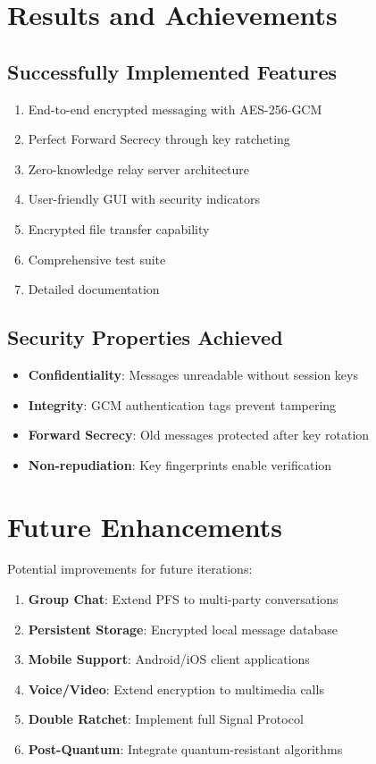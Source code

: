 \documentclass[12pt,a4paper]{article}
\begin{document}
\section{Results and Achievements}

\subsection{Successfully Implemented Features}

\begin{enumerate}
    \item End-to-end encrypted messaging with AES-256-GCM
    \item Perfect Forward Secrecy through key ratcheting
    \item Zero-knowledge relay server architecture
    \item User-friendly GUI with security indicators
    \item Encrypted file transfer capability
    \item Comprehensive test suite
    \item Detailed documentation
\end{enumerate}

\subsection{Security Properties Achieved}

\begin{itemize}
    \item \textbf{Confidentiality}: Messages unreadable without session keys
    \item \textbf{Integrity}: GCM authentication tags prevent tampering
    \item \textbf{Forward Secrecy}: Old messages protected after key rotation
    \item \textbf{Non-repudiation}: Key fingerprints enable verification
\end{itemize}

\section{Future Enhancements}

Potential improvements for future iterations:

\begin{enumerate}
    \item \textbf{Group Chat}: Extend PFS to multi-party conversations
    \item \textbf{Persistent Storage}: Encrypted local message database
    \item \textbf{Mobile Support}: Android/iOS client applications
    \item \textbf{Voice/Video}: Extend encryption to multimedia calls
    \item \textbf{Double Ratchet}: Implement full Signal Protocol
    \item \textbf{Post-Quantum}: Integrate quantum-resistant algorithms
\end{enumerate}
\end{document}
